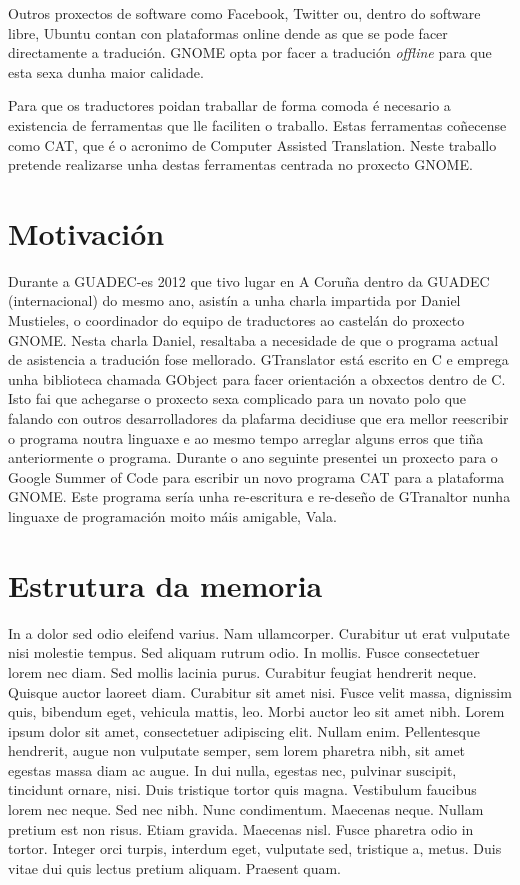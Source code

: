 Outros proxectos de software como Facebook, Twitter ou, dentro do software libre, Ubuntu contan con plataformas online dende as que se pode facer directamente a tradución. GNOME opta por facer a tradución \emph{offline} para que esta sexa dunha maior calidade.

Para que os traductores poidan traballar de forma comoda é necesario a existencia de ferramentas que lle faciliten o traballo. Estas ferramentas coñecense como CAT, que é o acronimo de Computer Assisted Translation. Neste traballo pretende realizarse unha destas ferramentas centrada no proxecto GNOME.

\section{Motivación}
Durante a GUADEC-es 2012 que tivo lugar en A Coruña dentro da GUADEC (internacional) do mesmo ano, asistín a unha charla impartida por Daniel Mustieles, o coordinador do equipo de traductores ao castelán do proxecto GNOME. Nesta charla Daniel, resaltaba a necesidade de que o programa actual de asistencia a tradución fose mellorado. GTranslator está escrito en C e emprega unha biblioteca chamada GObject para facer orientación a obxectos dentro de C. Isto fai que achegarse o proxecto sexa complicado para un novato polo que falando con outros desarrolladores da plafarma decidiuse que era mellor reescribir o programa noutra linguaxe e ao mesmo tempo arreglar alguns erros que tiña anteriormente o programa. Durante o ano seguinte presentei un proxecto para o Google Summer of Code para escribir un novo programa CAT para a plataforma GNOME. Este programa sería unha re-escritura e re-deseño de GTranaltor nunha linguaxe de programación moito máis amigable, Vala.

\section{Estrutura da memoria}

In a dolor sed odio eleifend varius. Nam ullamcorper. Curabitur ut erat vulputate nisi molestie tempus. Sed aliquam rutrum odio. In mollis. Fusce consectetuer lorem nec diam. Sed mollis lacinia purus. Curabitur feugiat hendrerit neque. Quisque auctor laoreet diam. Curabitur sit amet nisi. Fusce velit massa, dignissim quis, bibendum eget, vehicula mattis, leo. Morbi auctor leo sit amet nibh. Lorem ipsum dolor sit amet, consectetuer adipiscing elit. Nullam enim. Pellentesque hendrerit, augue non vulputate semper, sem lorem pharetra nibh, sit amet egestas massa diam ac augue. In dui nulla, egestas nec, pulvinar suscipit, tincidunt ornare, nisi. Duis tristique tortor quis magna. Vestibulum faucibus lorem nec neque. Sed nec nibh. Nunc condimentum. Maecenas neque. Nullam pretium est non risus. Etiam gravida. Maecenas nisl. Fusce pharetra odio in tortor. Integer orci turpis, interdum eget, vulputate sed, tristique a, metus. Duis vitae dui quis lectus pretium aliquam. Praesent quam.

